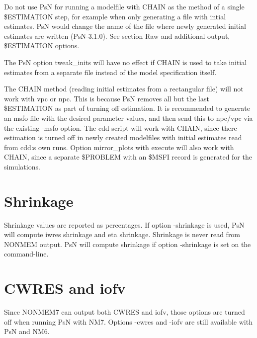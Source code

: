 Do not use PsN for running a modelfile with CHAIN as the method of a single \$ESTIMATION step, for example when only generating a file with intial estimates. PsN would change the name of the file where newly generated initial estimates are written (PsN-3.1.0). See section Raw and additional output, \$ESTIMATION options.

The PsN option tweak\_inits will have no effect if CHAIN is used to take initial estimates from a separate file instead of the model specification itself.

The CHAIN method (reading initial estimates from a rectangular file) will not work with vpc or npc. This is because PsN removes all but the last \$ESTIMATION as part of turning off estimation. It is recommended to generate an msfo file with the desired parameter values, and then send this to npc/vpc via the existing -msfo option. The cdd script will work with CHAIN, since there estimation is turned off in newly created modelfiles with initial estimates read from cdd:s own runs. Option mirror\_plots with execute will also work with CHAIN, since a separate \$PROBLEM with an \$MSFI record is generated for the simulations.

\section{Shrinkage}

Shrinkage values are reported as percentages. If option -shrinkage is used, PsN will compute iwres shrinkage and eta shrinkage. 
Shrinkage is never read from NONMEM output. PsN will compute shrinkage if option -shrinkage is set on the command-line.

\section{CWRES and iofv}

Since NONMEM7 can output both CWRES and iofv, those options are turned off when running PsN with NM7. Options -cwres and -iofv are still available with PsN and NM6.


